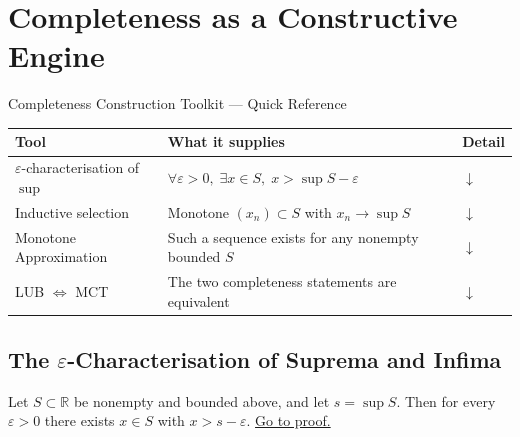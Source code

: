 
\section{Completeness as a Constructive Engine}
\label{sec:completeness-construction}

\begin{toolkitbox}{Completeness Construction Toolkit — Quick Reference}
\small
\begin{tabular}{l l l}
\toprule
\textbf{Tool} & \textbf{What it supplies} & \textbf{Detail} \\
\midrule
$\varepsilon$-characterisation of $\sup$
  & $\forall\varepsilon>0,\;\exists x\in S,\;x>\sup S-\varepsilon$
  & \hyperref[prop:eps-char-sup]{$\downarrow$} \\[3pt]
Inductive selection
  & Monotone $(x_n)\subset S$ with $x_n\to\sup S$
  & \hyperref[thm:inductive-selection]{$\downarrow$} \\[3pt]
Monotone Approximation
  & Such a sequence exists for any nonempty bounded $S$
  & \hyperref[prop:monotone-approx-bounds]{$\downarrow$} \\[3pt]
LUB $\Leftrightarrow$ MCT
  & The two completeness statements are equivalent
  & \hyperref[thm:LUB-iff-MCT]{$\downarrow$} \\
\bottomrule
\end{tabular}
\end{toolkitbox}

\subsection*{The $\varepsilon$-Characterisation of Suprema and Infima}
\label{subsec:eps-char}

\begin{proposition}
\label{prop:eps-char-sup}
Let $S\subset\mathbb{R}$ be nonempty and bounded above, and let
$s=\sup S$. Then for every $\varepsilon>0$ there exists $x\in S$ with
$x>s-\varepsilon$.
\hyperref[prf:eps-char-sup]{Go to proof.}
\end{proposition}

\begin{remark*}
\end{remark*}


